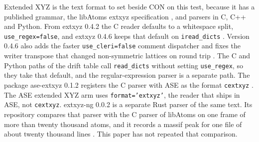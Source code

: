 \documentclass[preprint,12pt]{elsarticle}
\begin{document}
Extended XYZ is the text format to set beside CON on this test, because
it has a published grammar, the libAtoms extxyz specification
\cite{kermodeLibatomsExtxyzV0462026}, and parsers in C, C++ and Python.
From extxyz 0.4.2 the C reader defaults to a whitespace split,
\texttt{use\_regex=false}, and extxyz 0.4.6 keeps that default on
\texttt{iread\_dicts} \cite{kermodeExtxyz0422026}.
Version 0.4.6 also adds the faster
\texttt{use\_cleri=false} comment dispatcher and fixes the writer
transpose that changed non-symmetric lattices on round trip
\cite{kermodeLibatomsExtxyzV0462026}.
The C and Python paths of the drift table call \texttt{read\_dicts}
without setting \texttt{use\_regex}, so they take that default, and the
regular-expression parser is a separate path.
The package ase-extxyz 0.1.2 registers the C parser with ASE as the
format \texttt{cextxyz} \cite{kermodeAseExtxyz0122026}.
The ASE extended XYZ arm uses \texttt{format='extxyz'}, the reader that
ships in ASE, not \texttt{cextxyz}.
extxyz-ng 0.0.2 is a separate Rust parser of the same text.
Its repository compares that parser with the C parser of libAtoms on
one frame of more than twenty thousand atoms, and it records a massif
peak for one file of about twenty thousand lines
\cite{yuExtxyzNg0022026}.
This paper has not repeated that comparison.
\end{document}
